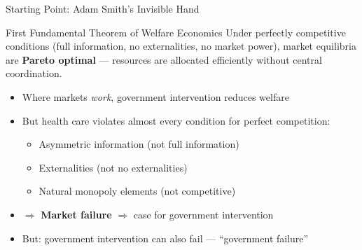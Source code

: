 \documentclass[aspectratio=169, 12pt]{beamer}
\begin{document}
\begin{frame}{Starting Point: Adam Smith's Invisible Hand}
  \begin{block}{First Fundamental Theorem of Welfare Economics}
    Under perfectly competitive conditions (full information, no externalities, no market power),
    market equilibria are \textbf{Pareto optimal} --- resources are allocated efficiently without
    central coordination.
  \end{block}
  \vspace{0.3em}
  \begin{itemize}
    \item Where markets \emph{work}, government intervention reduces welfare
    \item But health care violates almost every condition for perfect competition:
    \begin{itemize}
      \item Asymmetric information (not full information)
      \item Externalities (not no externalities)
      \item Natural monopoly elements (not competitive)
    \end{itemize}
    \item $\Rightarrow$ \textbf{Market failure} $\Rightarrow$ case for government intervention
    \item But: government intervention can also fail --- ``government failure''
  \end{itemize}
\end{frame}
\end{document}
